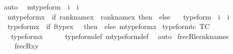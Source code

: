 \begin{isabellebody}
\ auto%
\endisatagproof
{\isafoldproof}%
%
\isadelimproof
\isanewline
%
\endisadelimproof
\isanewline
{}\isamarkupfalse%
\isanewline
\ \ mtype{\isacharunderscore}{\kern0pt}form\ {\isacharcolon}{\kern0pt}{\isacharcolon}{\kern0pt}\ {\isachardoublequoteopen}i\ {\isasymRightarrow}\ i{\isachardoublequoteclose}\ \isanewline
\ \ {\isachardoublequoteopen}mtype{\isacharunderscore}{\kern0pt}form{\isacharparenleft}{\kern0pt}x{\isacharparenright}{\kern0pt}\ {\isasymequiv}\ if\ rank{\isacharparenleft}{\kern0pt}name{}{\isacharparenleft}{\kern0pt}x{\isacharparenright}{\kern0pt}{\isacharparenright}{\kern0pt}\ {\isacharless}{\kern0pt}\ rank{\isacharparenleft}{\kern0pt}name{}{\isacharparenleft}{\kern0pt}x{\isacharparenright}{\kern0pt}{\isacharparenright}{\kern0pt}\ then\ {}\ else\ {}{\isachardoublequoteclose}\isanewline
\isanewline
{}\isamarkupfalse%
\isanewline
\ \ type{\isacharunderscore}{\kern0pt}form\ {\isacharcolon}{\kern0pt}{\isacharcolon}{\kern0pt}\ {\isachardoublequoteopen}i\ {\isasymRightarrow}\ i{\isachardoublequoteclose}\ \isanewline
\ \ {\isachardoublequoteopen}type{\isacharunderscore}{\kern0pt}form{\isacharparenleft}{\kern0pt}x{\isacharparenright}{\kern0pt}\ {\isasymequiv}\ if\ ftype{\isacharparenleft}{\kern0pt}x{\isacharparenright}{\kern0pt}\ {\isacharequal}{\kern0pt}\ {}\ then\ {}\ else\ mtype{\isacharunderscore}{\kern0pt}form{\isacharparenleft}{\kern0pt}x{\isacharparenright}{\kern0pt}{\isachardoublequoteclose}\isanewline
\isanewline
{}\isamarkupfalse%
\ type{\isacharunderscore}{\kern0pt}form{\isacharunderscore}{\kern0pt}tc\ {\isacharbrackleft}{\kern0pt}TC{\isacharbrackright}{\kern0pt}{\isacharcolon}{\kern0pt}\ \isanewline
\ \ \ {\isachardoublequoteopen}type{\isacharunderscore}{\kern0pt}form{\isacharparenleft}{\kern0pt}x{\isacharparenright}{\kern0pt}\ {\isasymin}\ {}{\isachardoublequoteclose}\isanewline
%
\isadelimproof
\ \ %
\endisadelimproof
%
\isatagproof
{}\isamarkupfalse%
\ type{\isacharunderscore}{\kern0pt}form{\isacharunderscore}{\kern0pt}def\ mtype{\isacharunderscore}{\kern0pt}form{\isacharunderscore}{\kern0pt}def\ \isamarkupfalse%
\ auto%
\endisatagproof
{\isafoldproof}%
%
\isadelimproof
\isanewline
%
\endisadelimproof
\isanewline
{}\isamarkupfalse%
\ frecR{\isacharunderscore}{\kern0pt}le{\isacharunderscore}{\kern0pt}rnk{\isacharunderscore}{\kern0pt}names\ {\isacharcolon}{\kern0pt}\isanewline
\ \ \ \ {\isachardoublequoteopen}frecR{\isacharparenleft}{\kern0pt}x{\isacharcomma}{\kern0pt}y{\isacharparenright}{\kern0pt}{\isachardoublequoteclose}\isanewline

\end{isabellebody}
